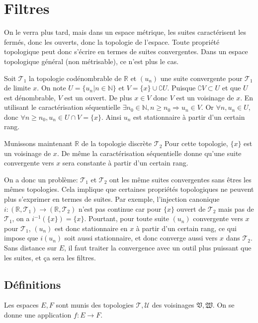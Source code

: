 \documentclass[a4paper, 11pt, french]{book}
\theoremstyle{plain} %
\theoremstyle{definition} %
\theoremstyle{remark} %
\newcommand{\1}{\mathds{1}}
\newcommand{\supegal}{\geqslant}
\newcommand{\inv}[1]{#1^{-1}}
\newcommand{\N}{\mathbb{N}}
\newcommand{\R}{\mathbb{R}}
\begin{document}
\chapter{Filtres}

On le verra plus tard, mais dans un espace métrique, les suites caractérisent les fermés, donc les ouverts, donc la topologie de l’espace.
Toute propriété topologique peut donc s’écrire en termes de suites convergentes.
Dans un espace topologique général (non métrisable), ce n’est plus le cas.

Soit $\mathscr{T}_1$ la topologie codénombrable de $\R$ et $(u_n)$ une suite convergente pour $\mathscr{T}_1$ de limite $x$.
On note $U=\{u_n|n\in\N\}$ et $V=\{x\}\cup\complement U$.
Puisque $\complement V\subset U$ et que $U$ est dénombrable, $V$ est un ouvert.
De plus $x\in V$ donc $V$ est un voisinage de $x$.
En utilisant le caractérisation séquentielle $\exists n_0\in\N, n\supegal n_0\Rightarrow u_n\in V$.
Or $\forall n, u_n\in U$, donc $\forall n\supegal n_0, u_n\in U\cap V=\{x\}$.
Ainsi $u_n$ est stationnaire à partir d'un certain rang.

Munissons maintenant $\R$ de la topologie discrète $\mathscr{T}_2$
Pour cette topologie, $\{x\}$ est un voisinage de $x$.
De même la caractérisation séquentielle donne qu'une suite convergente vers $x$ sera constante à partir d'un certain rang.

On a donc un problème: $\mathscr{T}_1$ et $\mathscr{T}_2$ ont les même suites convergentes sans êtres les mêmes topologies.
Cela implique que certaines propriétés topologiques ne peuvent plus s’exprimer en termes de suites.
Par exemple, l’injection canonique $i : (\R, \mathscr{T}_1)\rightarrow (\R, \mathscr{T}_2)$ n’est pas continue car pour $\{x\}$ ouvert de $\mathscr{T}_2$ mais pas de $\mathscr{T}_1$, on a $\inv{i}(\{x\})=\{x\}$.
Pourtant, pour toute suite $(u_n)$ convergente vers $x$ pour $\mathscr{T}_1$, $(u_n)$ est donc stationnaire en $x$ à partir d'un certain rang, ce qui impose que $i(u_n)$ soit aussi stationnaire, et donc converge aussi vers $x$ dans $\mathscr{T}_2$.
Sans distance sur $E$, il faut traiter la convergence avec un outil plus puissant que les suites, et ça sera les filtres.

\section{Définitions}

Les espaces $E, F$ sont munis des topologies $\mathscr{T}, \mathscr{U}$ des voisinages $\mathfrak{V}, \mathfrak{W}$.
On se donne une application $f:E\rightarrow F$.
\end{document}
